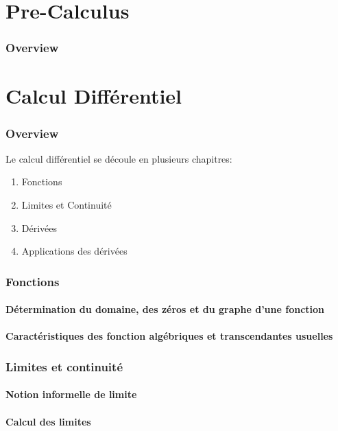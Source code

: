 \documentclass{article}
\begin{document}
\part{Pre-Calculus}
\section{Overview}
\pagebreak

\part{Calcul Différentiel}

\section{Overview}

Le calcul différentiel se découle en plusieurs chapitres:

\begin{enumerate}
    \item Fonctions
    \item Limites et Continuité
    \item Dérivées
    \item Applications des dérivées
\end{enumerate}

\section{Fonctions}
\subsection{Détermination du domaine, des zéros et du graphe d’une fonction}
\subsection{Caractéristiques des fonction algébriques et transcendantes usuelles}
\section{Limites et continuité}
\subsection{Notion informelle de limite}
\subsection{Calcul des limites}
\end{document}
